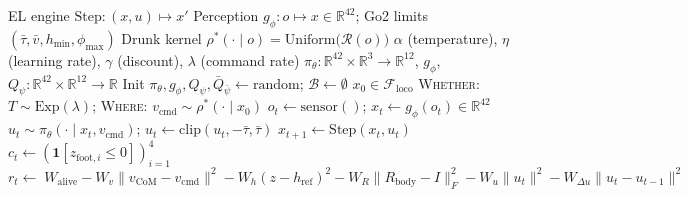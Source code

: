 \documentclass[11pt,a4paper]{article}
\newcommand{\R}{\mathbb{R}}
\newcommand{\cF}{\mathcal{F}}
\newcommand{\cB}{\mathcal{B}}
\newcommand{\cR}{\mathcal{R}}
\newcommand{\norm}[1]{\lVert #1 \rVert}
\begin{document}
\begin{algorithm}[H]
\caption{Drunk Walk on the Euler--Lagrange equation
  \textup{[Model-free locomotion via SVOT--SAC
  (Proposition~\ref{prop:svot-sac});
  cf.\ Algorithm~\ref{alg:drunk-walk} for Go]}}%
\label{alg:svot-locomotion}
\small
\begin{algorithmic}[1]
\Require EL engine $\mathrm{Step}: (x, u) \mapsto x'$
\Require Perception $g_\phi: o \mapsto x \in \R^{42}$;\;
  Go2 limits $(\bar\tau, \bar v, h_{\min}, \phi_{\max})$
\Require Drunk kernel
  $\rho^*(\cdot \mid o)
    = \mathrm{Uniform}\!\bigl(\cR(o)\bigr)$
\Require $\alpha$ (temperature),
  $\eta$ (learning rate),
  $\gamma$ (discount),
  $\lambda$ (command rate)
\Ensure $\pi_\theta : \R^{42} \times \R^3 \to \R^{12}$,\;
  $g_\phi$,\;
  $Q_\psi : \R^{42} \times \R^{12} \to \R$
\Statex
\State Init $\pi_\theta, g_\phi,
  Q_\psi, \bar Q_{\bar\psi}
  \gets \text{random}$;\;
  $\cB \gets \emptyset$
  \State $x_0 \in \cF_{\mathrm{loco}}$
  \State \textsc{Whether}:\;
    $T \sim \mathrm{Exp}(\lambda)$;\quad
    \textsc{Where}:\;
    $v_{\mathrm{cmd}} \sim \rho^*(\cdot \mid x_0)$
    \Statex
    \State $o_t \gets \mathrm{sensor}()$;\quad
      $x_t \gets g_\phi(o_t) \in \R^{42}$
    \Statex
    \State $u_t \sim
      \pi_\theta(\cdot \mid x_t, v_{\mathrm{cmd}})$;\quad
      $u_t \gets \mathrm{clip}(u_t, {-\bar\tau}, \bar\tau)$
    \Statex
    \State $x_{t+1} \gets \mathrm{Step}(x_t, u_t)$
    \State $c_t \gets
      (\mathbf{1}[z_{\mathrm{foot},i} \leq 0])_{i=1}^4$
    \Statex
    \State $r_t \gets
        \;W_{\mathrm{alive}}
        -W_v \norm{v_{\mathrm{CoM}} - v_{\mathrm{cmd}}}^2
        -W_h (z{-}h_{\mathrm{ref}})^2
        -W_R \norm{R_{\mathrm{body}}{-}I}_F^2
        -W_u \norm{u_t}^2
        -W_{\Delta u}\norm{u_t{-}u_{t-1}}^2$

\end{algorithmic}
\end{algorithm}
\end{document}
